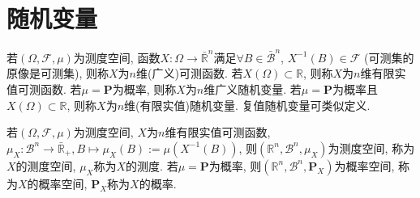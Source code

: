 \chapter{随机变量}

\begin{definition}
    若$(\Omega,\mathcal{F},\mu)$为测度空间, 函数$X:\Omega\to\bar{\mathbb{R} }^n$满足$\forall B \in \bar{\mathscr{B}}^n$, $X^{-1}(B)\in\mathcal{F}$ (可测集的原像是可测集), 则称$X$为$n$维(广义)可测函数. 若$X(\Omega)\subset \mathbb{R}$, 则称$X$为$n$维有限实值可测函数. 若$\mu=\mathbf{P}$为概率, 则称$X$为$n$维广义随机变量. 若$\mu=\mathbf{P}$为概率且$X(\Omega)\subset \mathbb{R}$, 则称$X$为$n$维(有限实值)随机变量. 复值随机变量可类似定义.
\end{definition}

\begin{definition}
    若$(\Omega,\mathcal{F},\mu)$为测度空间, $X$为$n$维有限实值可测函数, $\mu_X:{\mathscr{B}}^n\to \bar{\mathbb{R}}_+,B\mapsto\mu_X(B):=\mu(X^{-1}(B))$, 则$(\mathbb{R}^n,{\mathscr{B}}^n,\mu_X)$为测度空间, 称为$X$的测度空间, $\mu_X$称为$X$的测度. 若$\mu=\mathbf{P}$为概率, 则$(\mathbb{R}^n,{\mathscr{B}}^n,\mathbf{P}_X)$为概率空间, 称为$X$的概率空间, $\mathbf{P}_X$称为$X$的概率.
\end{definition}
